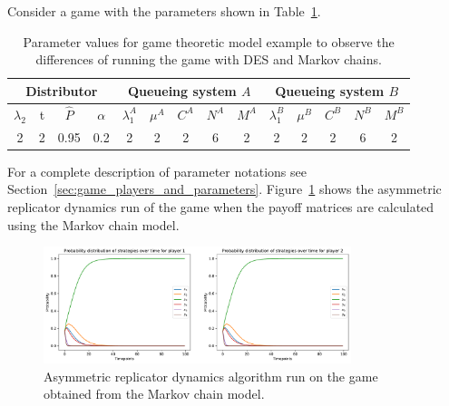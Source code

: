 Consider a game with the parameters shown in
Table~\ref{tab:game_with_des_parameters}.

\begin{table}[H]
    \caption{Parameter values for game theoretic model example to observe the
    differences of running the game with DES and Markov chains.}
    \begin{center}
        \begin{tabular}{||c|c|c|c||c|c|c|c|c||c|c|c|c|c||}
            \hline
            \multicolumn{4}{||c||}{\textbf{Distributor}} &
            \multicolumn{5}{c||}{\textbf{Queueing system \(A\)}} &
            \multicolumn{5}{c||}{\textbf{Queueing system \(B\)}} \\
            \hline
            \(\lambda_2\) & t & \footnotesize{\(\hat{P}\)} & \(\alpha\) &
            \(\lambda_1^A\) & \(\mu^A\) & \(C^A\) & \(N^A\) & \(M^A\) &
            \(\lambda_1^B\) & \(\mu^B\) & \(C^B\) & \(N^B\) & \(M^B\) \\
            \hline
            2 & 2 & 0.95 & 0.2 & 2 & 2 & 2 & 6 & 2 & 2 & 2 & 2 & 6 & 2 \\
            \hline
        \end{tabular}
    \end{center}
    \label{tab:game_with_des_parameters}
\end{table}

For a complete description of parameter notations see
Section~\ref{sec:game_players_and_parameters}.
Figure~\ref{fig:game_des_markov_baseline} shows the asymmetric replicator
dynamics run of the game when the payoff matrices are calculated using the
Markov chain model.

\begin{figure}[ht]
    \centering
    \includegraphics[width=0.8\textwidth]{chapters/06_agent_based_extension/Bin/game_model_with_des/game_markov_baseline.pdf}
    \caption{Asymmetric replicator dynamics algorithm run on the game obtained
    from the Markov chain model.}
    \label{fig:game_des_markov_baseline}
\end{figure}

